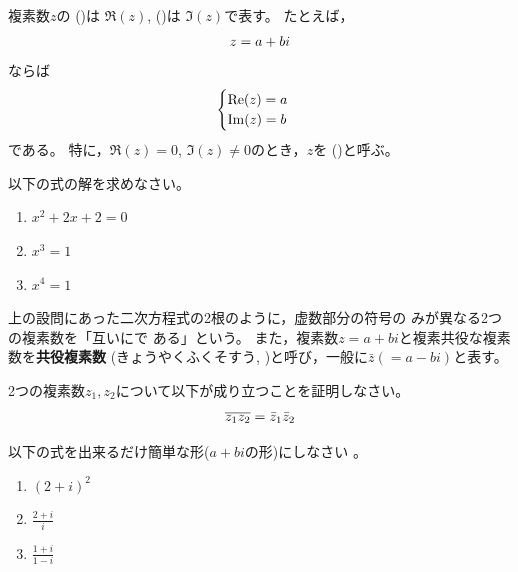 \documentclass[twocolumn,11pt]{jarticle}
\begin{document}
複素数$z$の
()は
$\Re (z)$\index{$\Re$}, 
()は
$\Im (z)$\index{$\Im$}で表す。
たとえば，
\begin{align}
z=a+bi \notag
\end{align}
ならば
\begin{align}
  \begin{cases}
    \Re (z)=a\\
    \Im (z)=b
  \end{cases}\notag
\end{align}
である。
特に，$\Re (z)=0$, $\Im (z)\ne 0$のとき，$z$を
()と呼ぶ。

\nquestion\label{eq:eq-complex}
以下の式の解を求めなさい。
\begin{enumerate}
\item $x^2+2x+2=0$
\item $x^3=1$
\item $x^4=1$
\end{enumerate}

\comment 上の設問にあった二次方程式の2根のように，虚数部分の符号の
みが異なる2つの複素数を「互いにで
ある」という。
また，複素数$z=a+bi$と複素共役な複素数を\textbf{共役複素数}
(きょうやくふくそすう, )と呼び，一般に$\bar{z}(=a-bi)$と表す。

\nquestion
2つの複素数$z_1,z_2$について以下が成り立つことを証明しなさい。
\begin{align}
  \overline{z_1z_2}=\bar{z}_1\bar{z}_2\notag
\end{align}

\exercise
 以下の式を出来るだけ簡単な形($a+bi$の形)にしなさい
。
  \begin{enumerate}
  \item\label{iitem:(2+i)^2} $(2+i)^2$
  \item\label{iitem:(2+i)/i} $\displaystyle\frac{2+i}{i}$
  \item\label{iitem:(1+i)/(1-i)} $\displaystyle\frac{1+i}{1-i}$
  \end{enumerate}
\end{document}
